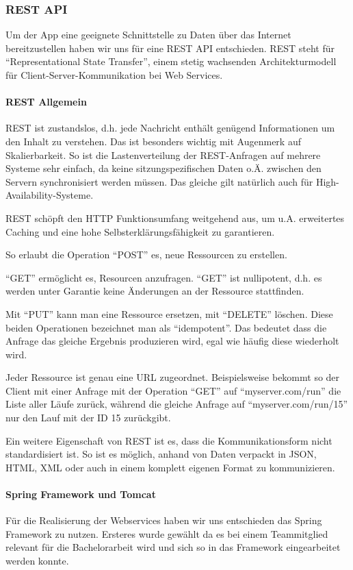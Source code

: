 \subsubsection{REST API}
Um der App eine geeignete Schnittstelle zu Daten über das Internet bereitzustellen haben wir uns für eine REST API entschieden.
REST steht für ``Representational State Transfer'', einem stetig wachsenden Architekturmodell für Client-Server-Kommunikation bei Web Services.
\paragraph{REST Allgemein}
REST ist zustandslos, d.h. jede Nachricht enthält genügend Informationen um den Inhalt zu verstehen. Das ist besonders wichtig mit Augenmerk auf Skalierbarkeit. So ist die Lastenverteilung der REST-Anfragen auf mehrere Systeme sehr einfach, da keine sitzungspezifischen Daten o.Ä. zwischen den Servern synchronisiert werden müssen. Das gleiche gilt natürlich auch für High-Availability-Systeme.

REST schöpft den HTTP Funktionsumfang weitgehend aus, um u.A. erweitertes Caching und eine hohe Selbsterklärungsfähigkeit zu garantieren.

So erlaubt die Operation ``POST'' es, neue Ressourcen zu erstellen.

``GET'' ermöglicht es, Resourcen anzufragen. ``GET'' ist nullipotent, d.h. es werden unter Garantie keine Änderungen an der Ressource stattfinden.

Mit ``PUT'' kann man eine Ressource ersetzen, mit ``DELETE'' löschen. Diese beiden Operationen bezeichnet man als ``idempotent''. Das bedeutet dass die Anfrage das gleiche Ergebnis produzieren wird, egal wie häufig diese wiederholt wird.

Jeder Ressource ist genau eine URL zugeordnet. Beispielsweise bekommt so der Client mit einer Anfrage mit der Operation ``GET'' auf ``myserver.com/run'' die Liste aller Läufe zurück, während die gleiche Anfrage auf ``myserver.com/run/15'' nur den Lauf mit der ID 15 zurückgibt. 

Ein weitere Eigenschaft von REST ist es, dass die Kommunikationsform nicht standardisiert ist. So ist es möglich, anhand von Daten verpackt in JSON, HTML, XML oder auch in einem komplett eigenen Format zu kommunizieren.
\paragraph{Spring Framework und Tomcat}
Für die Realisierung der Webservices haben wir uns entschieden das Spring Framework zu nutzen.
Ersteres wurde gewählt da es bei einem Teammitglied relevant für die Bachelorarbeit wird und sich so in das Framework eingearbeitet werden konnte. 

